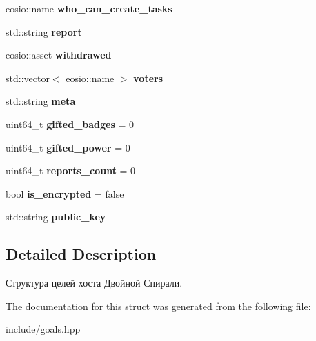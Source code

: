 \begin{DoxyCompactItemize}
\item 
\mbox{\label{structgoals_a26f12e3cf4bd9b71bcc23835b0218f13}} 
eosio\+::name {\bfseries who\+\_\+can\+\_\+create\+\_\+tasks}
\item 
\mbox{\label{structgoals_af4397668a230464d201d04d2d681a396}} 
std\+::string {\bfseries report}
\item 
\mbox{\label{structgoals_a7be33b74b9775c4a81eccc70c88287af}} 
eosio\+::asset {\bfseries withdrawed}
\item 
\mbox{\label{structgoals_abb90a7b4a33e2e4f1998ed1b67ecd3c2}} 
std\+::vector$<$ eosio\+::name $>$ {\bfseries voters}
\item 
\mbox{\label{structgoals_a556bed0c2aa8e8199bba15f7e547bb2b}} 
std\+::string {\bfseries meta}
\item 
\mbox{\label{structgoals_a7bce6066ed77bb9d9b2276b7a4a6608f}} 
uint64\+\_\+t {\bfseries gifted\+\_\+badges} = 0
\item 
\mbox{\label{structgoals_a8354980258d5a0080bac28d7823c71c1}} 
uint64\+\_\+t {\bfseries gifted\+\_\+power} = 0
\item 
\mbox{\label{structgoals_a8cbd1349aadc5c372444b234d55bed57}} 
uint64\+\_\+t {\bfseries reports\+\_\+count} = 0
\item 
\mbox{\label{structgoals_a50495b51590f77692594d4e9cffc8ab9}} 
bool {\bfseries is\+\_\+encrypted} = false
\item 
\mbox{\label{structgoals_a3fb010568bcb02eb1f3bee688471fb82}} 
std\+::string {\bfseries public\+\_\+key}
\end{DoxyCompactItemize}


\subsection{Detailed Description}
Структура целей хоста Двойной Спирали. 

The documentation for this struct was generated from the following file\+:\begin{DoxyCompactItemize}
\item 
include/goals.\+hpp\end{DoxyCompactItemize}
